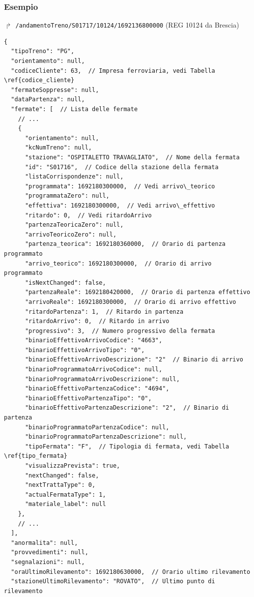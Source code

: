 \documentclass[12pt,italian]{report}
\begin{document}
\subsubsection{Esempio}

$\Rsh$ \texttt{/andamentoTreno/S01717/10124/1692136800000} \hfill (REG
10124 da Brescia)

\begin{verbatim}
{
  "tipoTreno": "PG",
  "orientamento": null,
  "codiceCliente": 63,  // Impresa ferroviaria, vedi Tabella \ref{codice_cliente}
  "fermateSoppresse": null,
  "dataPartenza": null,
  "fermate": [  // Lista delle fermate
    // ...
    {
      "orientamento": null,
      "kcNumTreno": null,
      "stazione": "OSPITALETTO TRAVAGLIATO",  // Nome della fermata
      "id": "S01716",  // Codice della stazione della fermata
      "listaCorrispondenze": null,
      "programmata": 1692180300000,  // Vedi arrivo\_teorico
      "programmataZero": null,
      "effettiva": 1692180300000,  // Vedi arrivo\_effettivo
      "ritardo": 0,  // Vedi ritardoArrivo
      "partenzaTeoricaZero": null,
      "arrivoTeoricoZero": null,
      "partenza_teorica": 1692180360000,  // Orario di partenza programmato
      "arrivo_teorico": 1692180300000,  // Orario di arrivo programmato
      "isNextChanged": false,
      "partenzaReale": 1692180420000,  // Orario di partenza effettivo
      "arrivoReale": 1692180300000,  // Orario di arrivo effettivo
      "ritardoPartenza": 1,  // Ritardo in partenza
      "ritardoArrivo": 0,  // Ritardo in arrivo
      "progressivo": 3,  // Numero progressivo della fermata
      "binarioEffettivoArrivoCodice": "4663",
      "binarioEffettivoArrivoTipo": "0",
      "binarioEffettivoArrivoDescrizione": "2"  // Binario di arrivo
      "binarioProgrammatoArrivoCodice": null,
      "binarioProgrammatoArrivoDescrizione": null,
      "binarioEffettivoPartenzaCodice": "4694",
      "binarioEffettivoPartenzaTipo": "0",
      "binarioEffettivoPartenzaDescrizione": "2",  // Binario di partenza
      "binarioProgrammatoPartenzaCodice": null,
      "binarioProgrammatoPartenzaDescrizione": null,
      "tipoFermata": "F",  // Tipologia di fermata, vedi Tabella \ref{tipo_fermata}
      "visualizzaPrevista": true,
      "nextChanged": false,
      "nextTrattaType": 0,
      "actualFermataType": 1,
      "materiale_label": null
    },
    // ...
  ],
  "anormalita": null,
  "provvedimenti": null,
  "segnalazioni": null,
  "oraUltimoRilevamento": 1692180630000,  // Orario ultimo rilevamento
  "stazioneUltimoRilevamento": "ROVATO",  // Ultimo punto di rilevamento

\end{verbatim}
\end{document}
